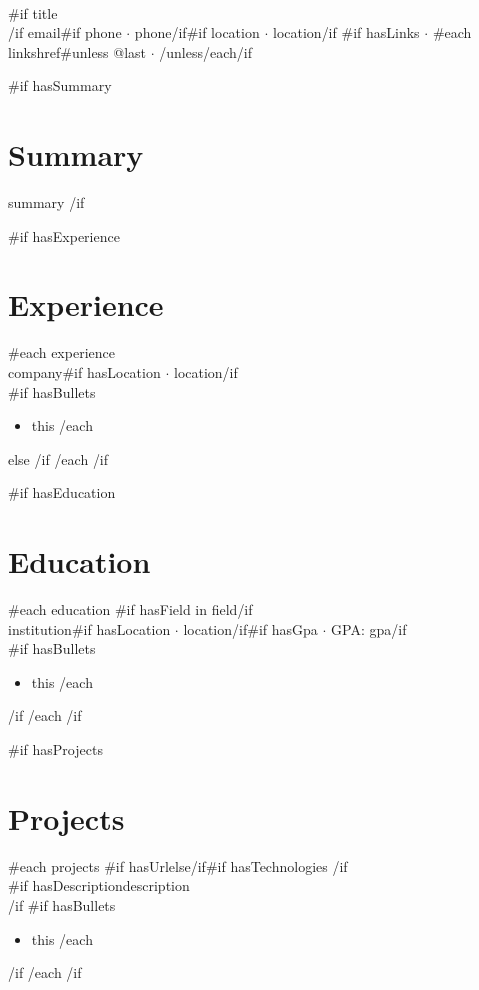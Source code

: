 \documentclass[10.5pt,a4paper]{article}
\begin{document}
{\Huge\bfseries\color{accent} \relax{}}\\[2pt]
{{#if title}}{\large {}\relax{}}\\[4pt]
{{/if}}
{\small
{{email}}{{#if phone}} $\cdot$ {{phone}}{{/if}}{{#if location}} $\cdot$ {{location}}{{/if}}
{{#if hasLinks}} $\cdot$ {{#each links}}{{href}}{{#unless @last}} $\cdot$ {{/unless}}{{/each}}{{/if}}
}

\vspace{4pt}

{{#if hasSummary}}
\section{Summary}
{{summary}}
{{/if}}

{{#if hasExperience}}
\section{Experience}
{{#each experience}}
\textbf{\relax{}} \hfill \textit{\relax{}}\\
{{company}}{{#if hasLocation}} $\cdot$ {{location}}{{/if}}\\
{{#if hasBullets}}
\begin{itemize}
{{#each bullets}}\item {{this}}
{{/each}}
\end{itemize}
{{else}}
\vspace{4pt}
{{/if}}
{{/each}}
{{/if}}

{{#if hasEducation}}
\section{Education}
{{#each education}}
\textbf{\relax{}}{{#if hasField}} in {{field}}{{/if}} \hfill \textit{\relax{}}\\
{{institution}}{{#if hasLocation}} $\cdot$ {{location}}{{/if}}{{#if hasGpa}} $\cdot$ GPA: {{gpa}}{{/if}}\\
{{#if hasBullets}}
\begin{itemize}
{{#each bullets}}\item {{this}}
{{/each}}
\end{itemize}
{{/if}}
{{/each}}
{{/if}}

{{#if hasProjects}}
\section{Projects}
{{#each projects}}
{{#if hasUrl}}\textbf{\relax{}}{{else}}\textbf{\relax{}}{{/if}}{{#if hasTechnologies}} \hfill \textit{\relax{}}{{/if}}\\
{{#if hasDescription}}{{description}}\\
{{/if}}
{{#if hasBullets}}
\begin{itemize}
{{#each bullets}}\item {{this}}
{{/each}}
\end{itemize}
{{/if}}
{{/each}}
{{/if}}
\end{document}
